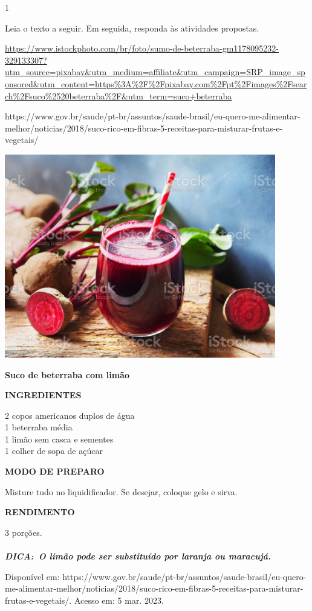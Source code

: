 \begin{itemize}
{{{\begin{itemize}

\num{1}

Leia o texto a seguir. Em seguida, responda às atividades propostas.

\url{https://www.istockphoto.com/br/foto/sumo-de-beterraba-gm1178095232-329133307?utm_source=pixabay\&utm_medium=affiliate\&utm_campaign=SRP_image_sponsored\&utm_content=https\%3A\%2F\%2Fpixabay.com\%2Fpt\%2Fimages\%2Fsearch\%2Fsuco\%2520beterraba\%2F\&utm_term=suco+beterraba}

https://www.gov.br/saude/pt-br/assuntos/saude-brasil/eu-quero-me-alimentar-melhor/noticias/2018/suco-rico-em-fibras-5-receitas-para-misturar-frutas-e-vegetais/

\includegraphics[width=4.65278in,height=3.48958in]{media/image10.jpeg}

\textbf{Suco de beterraba com limão}

\textbf{INGREDIENTES}

2 copos americanos duplos de água\\
1 beterraba média\\
1 limão sem casca e sementes\\
1 colher de sopa de açúcar

\textbf{MODO DE PREPARO}

Misture tudo no liquidificador. Se desejar, coloque gelo e sirva.

\textbf{RENDIMENTO}

3 porções.\\
\emph{\textbf{\\
DICA:~O limão pode ser substituído por laranja ou maracujá.}}

Disponível em:
https://www.gov.br/saude/pt-br/assuntos/saude-brasil/eu-quero-me-alimentar-melhor/noticias/2018/suco-rico-em-fibras-5-receitas-para-misturar-frutas-e-vegetais/.
Acesso em: 5 mar. 2023.


\end{itemize}}}}
\end{itemize}
